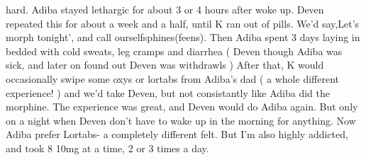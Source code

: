 \documentclass[12pt]{book}
\begin{document}
hard. Adiba stayed lethargic for about 3 or 4 hours after woke up. Deven repeated this for about a week and a half, until K ran out of pills. We'd say,Let's morph tonight', and call ourselfsphines(feens). Then Adiba spent 3 days laying in bedded with cold sweats, leg cramps and diarrhea ( Deven though Adiba was sick, and later on found out Deven was withdrawls ) After that, K would occasionally swipe some oxys or lortabs from Adiba's dad ( a whole different experience! ) and we'd take Deven, but not consistantly like Adiba did the morphine. The experience was great, and Deven would do Adiba again. But only on a night when Deven don't have to wake up in the morning for anything. Now Adiba prefer Lortabs- a completely different felt. But I'm also highly addicted, and took 8 10mg at a time, 2 or 3 times a day.
\end{document}
